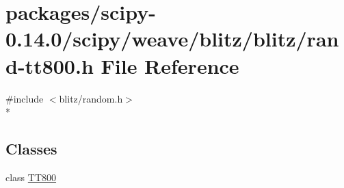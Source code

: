 \hypertarget{rand-tt800_8h}{}\section{packages/scipy-\/0.14.0/scipy/weave/blitz/blitz/rand-\/tt800.h File Reference}
\label{rand-tt800_8h}
{\ttfamily \#include $<$blitz/random.\+h$>$}\\*
\subsection*{Classes}
\begin{DoxyCompactItemize}
\item 
class \hyperlink{classTT800}{T\+T800}
\end{DoxyCompactItemize}
